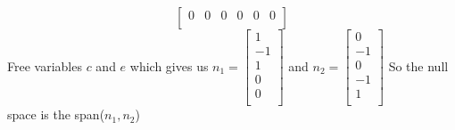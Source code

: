 \documentclass{article}
\begin{document}
\begin{enumerate}[1.]
$$\begin{bmatrix}
0  & 0  & 0  & 0  & 0  & 0 \\
\end{bmatrix}
$$
\newline
Free variables $c$ and $e$ which gives us
$n_1 = \begin{bmatrix} 1 \\ -1 \\ 1 \\ 0 \\ 0 \\ \end{bmatrix}$
and
$n_2 = \begin{bmatrix} 0 \\ -1 \\ 0 \\ -1 \\ 1 \\ \end{bmatrix}$
\newline
So the null space is the span($n_1,n_2$)


\end{enumerate}
\end{document}
